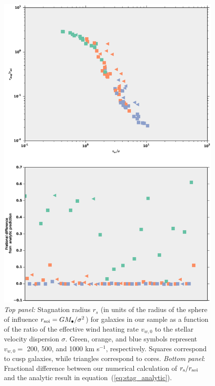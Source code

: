 \documentclass[usenatbib,fleqn]{mn2e}
\begin{document}
\begin{figure}
  \includegraphics[width=\columnwidth]{rs.eps}
  \caption{\label{fig:stag} \emph{Top panel:} Stagnation radius
    $r_{s}$ (in units of the radius of the sphere of influence $r_{\rm
      soi} = GM_{\bullet}/\sigma^{2}$) for galaxies in our sample as a
    function of the ratio of the effective wind heating rate $v_{w,0}$
    to the stellar velocity dispersion $\sigma$.  Green, orange, and
    blue symbols represent $v_{w,0} =$ 200, 500, and 1000 km s$^{-1}$,
    respectively.  Squares correspond to cusp galaxies, while
    triangles correspond to cores. \emph{Bottom panel}: Fractional
    difference between our numerical calculation of $r_{\rm s}/r_{\rm
      soi}$ and the analytic result in
    equation~(\ref{eq:stag_analytic}). }
\end{figure}
\end{document}
